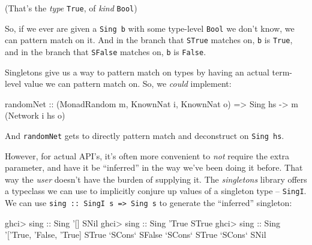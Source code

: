 \documentclass[]{article}
\newenvironment{Shaded}{}{}
\newcommand{\CharTok}[1]{\textcolor[rgb]{0.25,0.44,0.63}{#1}}
\newcommand{\DataTypeTok}[1]{\textcolor[rgb]{0.56,0.13,0.00}{#1}}
\newcommand{\FunctionTok}[1]{\textcolor[rgb]{0.02,0.16,0.49}{#1}}
\newcommand{\NormalTok}[1]{#1}
\newcommand{\OtherTok}[1]{\textcolor[rgb]{0.00,0.44,0.13}{#1}}
\begin{document}
(That's the \emph{type} \texttt{\textquotesingle{}True}, of \emph{kind}
\texttt{Bool})

So, if we ever are given a \texttt{Sing\ b} with some type-level \texttt{Bool}
we don't know, we can pattern match on it. And in the branch that \texttt{STrue}
matches on, \texttt{b} is \texttt{\textquotesingle{}True}, and in the branch
that \texttt{SFalse} matches on, \texttt{b} is \texttt{False}.

Singletons give us a way to pattern match on types by having an actual
term-level value we can pattern match on. So, we \emph{could} implement:

\begin{Shaded}
\begin{Highlighting}[]
\OtherTok{randomNet ::}\NormalTok{ (}\DataTypeTok{MonadRandom}\NormalTok{ m, }\DataTypeTok{KnownNat}\NormalTok{ i, }\DataTypeTok{KnownNat}\NormalTok{ o)}
          \OtherTok{=>} \DataTypeTok{Sing}\NormalTok{ hs }\OtherTok{->}\NormalTok{ m (}\DataTypeTok{Network}\NormalTok{ i hs o)}
\end{Highlighting}
\end{Shaded}

And \texttt{randomNet} gets to directly pattern match and deconstruct on
\texttt{Sing\ hs}.

However, for actual API's, it's often more convenient to \emph{not} require the
extra parameter, and have it be ``inferred'' in the way we've been doing it
before. That way the \emph{user} doesn't have the burden of supplying it. The
\emph{singletons} library offers a typeclass we can use to implicitly conjure up
values of a singleton type -- \texttt{SingI}. We can use
\texttt{sing\ ::\ SingI\ s\ =\textgreater{}\ Sing\ s} to generate the
``inferred'' singleton:

\begin{Shaded}
\begin{Highlighting}[]
\NormalTok{ghci}\FunctionTok{>}\OtherTok{ sing ::} \DataTypeTok{Sing}\NormalTok{ '[]}
\DataTypeTok{SNil}
\NormalTok{ghci}\FunctionTok{>}\OtherTok{ sing ::} \DataTypeTok{Sing}\NormalTok{ '}\DataTypeTok{True}
\DataTypeTok{STrue}
\NormalTok{ghci}\FunctionTok{>}\OtherTok{ sing ::} \DataTypeTok{Sing} \CharTok{'['}\DataTypeTok{True}\NormalTok{, '}\DataTypeTok{False}\NormalTok{, '}\DataTypeTok{True}\NormalTok{]}
\DataTypeTok{STrue} \OtherTok{`SCons`} \DataTypeTok{SFalse} \OtherTok{`SCons`} \DataTypeTok{STrue} \OtherTok{`SCons`} \DataTypeTok{SNil}
\end{Highlighting}
\end{Shaded}
\end{document}
